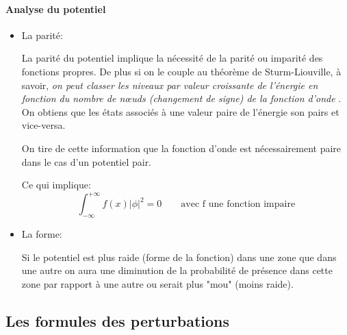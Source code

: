 \paragraph{Analyse du potentiel}

\begin{itemize}

	\item La parité: 


	La parité du potentiel implique la nécessité de la parité ou imparité des fonctions propres. De plus si on le couple au théorème de Sturm-Liouville, à savoir, \textit{on peut classer les niveaux par valeur croissante de l'énergie en fonction du nombre de nœuds (changement de signe) de la fonction d'onde }. On obtiens que les états associés à une valeur paire de l'énergie son pairs et vice-versa.

	On tire de cette information que la fonction d'onde est nécessairement paire dans le cas d'un potentiel pair. 

	Ce qui implique:
	\[
		\int_{-\infty}^{+\infty}f(x)|\phi|^2=0 \qquad \text{avec f une fonction impaire}
	\]
	\item La forme: 

	Si le potentiel est plus raide (forme de la fonction) dans une zone que dans une autre on aura une diminution de la probabilité de présence dans cette zone par rapport à une autre ou serait plus "mou" (moins raide).

\end{itemize}


\subsection*{Les formules des perturbations}



